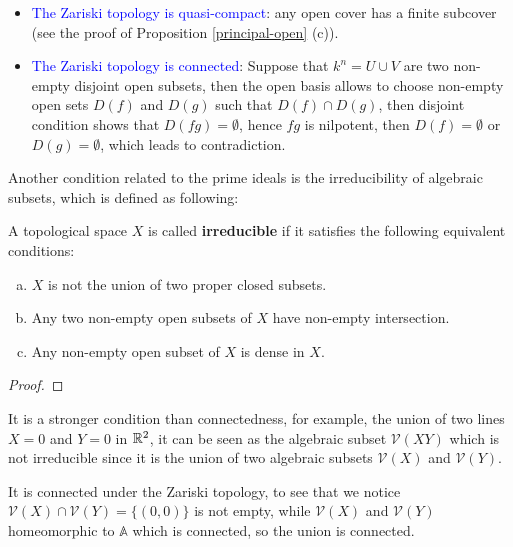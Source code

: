\begin{itemize}
    \item \textcolor{blue}{The Zariski topology is quasi-compact}: any open cover has a finite subcover (see the proof of  Proposition \ref{principal-open} (c)).
    
    \item \textcolor{blue}{The Zariski topology is connected}: Suppose that \(k^n = U \cup V\) are two non-empty disjoint open subsets, then the open basis allows to choose non-empty open sets \(D(f)\) and \(D(g)\) such that \(D(f)\cap D(g)\), then disjoint condition shows that \(D(fg) = \emptyset\), hence \(fg\) is nilpotent, then \(D(f) =\emptyset\) or \(D(g) = \emptyset\), which leads to contradiction.
\end{itemize}

Another condition related to the prime ideals is the irreducibility of algebraic subsets, which is defined as following:
\begin{colordefinition}
    A topological space \(X\) is called \textbf{irreducible} if it satisfies the following equivalent conditions:
    \begin{enumerate}[(a)]
        \item \(X\) is not the union of two proper closed subsets.
        \item Any two non-empty open subsets of \(X\) have non-empty intersection.
        \item Any non-empty open subset of \(X\) is dense in \(X\).
    \end{enumerate}
\end{colordefinition}

\begin{proof}
    
\end{proof}

\begin{remark}
    It is a stronger condition than connectedness, for example, the union of two lines \(X = 0\) and \(Y = 0\) in \(\mathbb{R}^2\), it can be seen as the algebraic subset \(\mathcal{V}(XY) \) which is not irreducible since it is the union of two algebraic subsets \(\mathcal{V}(X)\) and \(\mathcal{V}(Y)\).

    It is connected under the Zariski topology, to see that we notice \(\mathcal{V}(X) \cap \mathcal{V}(Y) = \{(0,0)\}\) is not empty, while \(\mathcal{V}(X)\) and \(\mathcal{V}(Y)\) homeomorphic to \(\mathbb{A}\) which is connected, so the union is connected.
\end{remark}

